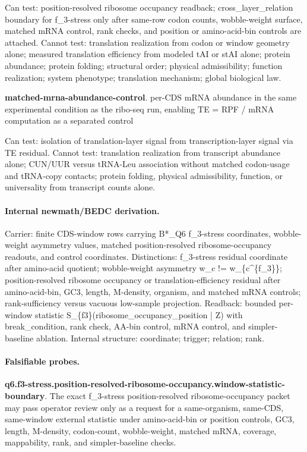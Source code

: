 Can test: position-resolved ribosome occupancy readback; cross\_layer\_relation boundary for f\_3-stress only after same-row codon counts, wobble-weight surface, matched mRNA control, rank checks, and position or amino-acid-bin controls are attached. Cannot test: translation realization from codon or window geometry alone; measured translation efficiency from modeled tAI or stAI alone; protein abundance; protein folding; structural order; physical admissibility; function realization; system phenotype; translation mechanism; global biological law.

\textbf{matched-mrna-abundance-control}. per-CDS mRNA abundance in the same experimental condition as the ribo-seq run, enabling TE = RPF / mRNA computation as a separated control

Can test: isolation of translation-layer signal from transcription-layer signal via TE residual. Cannot test: translation realization from transcript abundance alone; CUN/UUR versus tRNA-Leu association without matched codon-usage and tRNA-copy contacts; protein folding, physical admissibility, function, or universality from transcript counts alone.

\paragraph{Internal newmath/BEDC derivation.} Carrier: finite CDS-window rows carrying B*\_Q6 f\_3-stress coordinates, wobble-weight asymmetry values, matched position-resolved ribosome-occupancy readouts, and control coordinates. Distinctions: f\_3-stress residual coordinate after amino-acid quotient; wobble-weight asymmetry w\_c != w\_\{c\textasciicircum{}\{f\_3\}\}; position-resolved ribosome occupancy or translation-efficiency residual after amino-acid-bin, GC3, length, M-density, organism, and matched mRNA controls; rank-sufficiency versus vacuous low-sample projection. Readback: bounded per-window statistic S\_\{f3\}(ribosome\_occupancy\_position | Z) with break\_condition, rank check, AA-bin control, mRNA control, and simpler-baseline ablation. Internal structure: coordinate; trigger; relation; rank.

\paragraph{Falsifiable probes.}
\textbf{q6.f3-stress.position-resolved-ribosome-occupancy.window-statistic-boundary}. The exact f\_3-stress position-resolved ribosome-occupancy packet may pass operator review only as a request for a same-organism, same-CDS, same-window external statistic under amino-acid-bin or position controls, GC3, length, M-density, codon-count, wobble-weight, matched mRNA, coverage, mappability, rank, and simpler-baseline checks.

